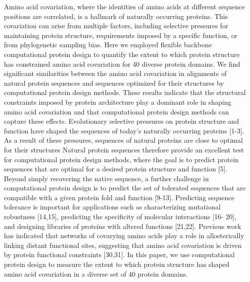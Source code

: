 Amino acid covariation, where the identities of amino acids at different sequence positions are correlated, is a hallmark of naturally occurring proteins. \cite{ollikainen2013computational}
This covariation can arise from multiple factors, including selective pressures for maintaining protein structure, requirements imposed by a specific function, or from phylogenetic sampling bias. \cite{ollikainen2013computational}
Here we employed flexible backbone computational protein design to quantify the extent to which protein structure has constrained amino acid covariation for 40 diverse protein domains. \cite{ollikainen2013computational}
We find significant similarities between the amino acid covariation in alignments of natural protein sequences and sequences optimized for their structures by computational protein design methods. \cite{ollikainen2013computational}
These results indicate that the structural constraints imposed by protein architecture play a dominant role in shaping amino acid covariation and that computational protein design methods can capture these effects.  \cite{ollikainen2013computational}
Evolutionary selective pressures on protein structure and function have shaped the sequences of today's naturally occurring proteins [1-3]. As a result of these pressures, sequences of natural proteins are close to optimal for their structures \cite{ollikainen2013computational}
Natural protein sequences therefore provide an excellent test for computational protein design methods, where the goal is to predict protein sequences that are optimal for a desired protein structure and function [5]. \cite{ollikainen2013computational}
Beyond simply recovering the native sequence, a further challenge in computational protein design is to predict the set of tolerated sequences that are compatible with a given protein fold and function [9-13]. Predicting sequence tolerance is important for applications such as characterizing mutational robustness [14,15], predicting the specificity of molecular interactions [16- 20], and designing libraries of proteins with altered functions [21,22].  \cite{ollikainen2013computational}
Previous work has indicated that networks of covarying amino acids play a role in allosterically linking distant functional sites, suggesting that amino acid covariation is driven by protein functional constraints [30,31]. \cite{ollikainen2013computational}
In this paper, we use computational protein design to measure the extent to which protein structure has shaped amino acid covariation in a diverse set of 40 protein domains. \cite{ollikainen2013computational}
